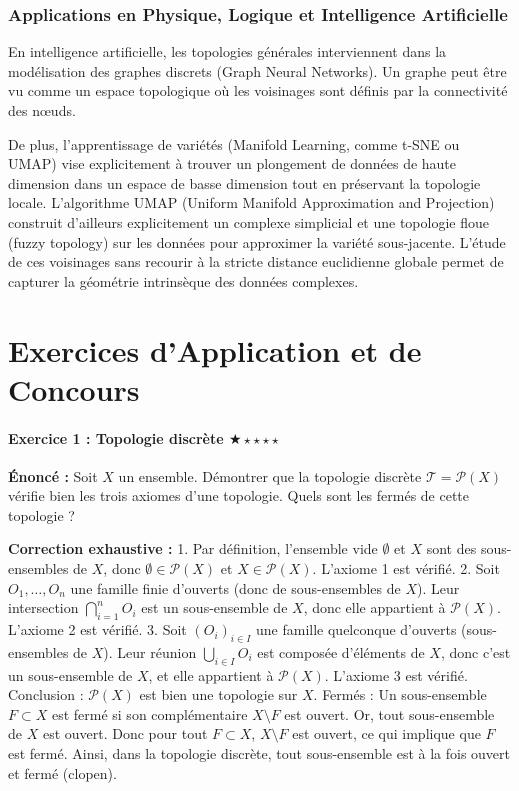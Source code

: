\documentclass[11pt,a4paper]{article}
\begin{document}
\section{Applications en Physique, Logique et Intelligence Artificielle}

En intelligence artificielle, les topologies générales interviennent dans la modélisation des graphes discrets (Graph Neural Networks). Un graphe peut être vu comme un espace topologique où les voisinages sont définis par la connectivité des nœuds.

De plus, l'apprentissage de variétés (Manifold Learning, comme t-SNE ou UMAP) vise explicitement à trouver un plongement de données de haute dimension dans un espace de basse dimension tout en préservant la topologie locale. L'algorithme UMAP (Uniform Manifold Approximation and Projection) construit d'ailleurs explicitement un complexe simplicial et une topologie floue (fuzzy topology) sur les données pour approximer la variété sous-jacente. L'étude de ces voisinages sans recourir à la stricte distance euclidienne globale permet de capturer la géométrie intrinsèque des données complexes.

\newpage
\part{Exercices d'Application et de Concours}
\subsection*{Exercice 1 : Topologie discrète \quad $\bigstar\star\star\star\star$}
\textbf{Énoncé :}
Soit $X$ un ensemble. Démontrer que la topologie discrète $\mathcal{T} = \mathcal{P}(X)$ vérifie bien les trois axiomes d'une topologie. Quels sont les fermés de cette topologie ?

\textbf{Correction exhaustive :}
1. Par définition, l'ensemble vide $\emptyset$ et $X$ sont des sous-ensembles de $X$, donc $\emptyset \in \mathcal{P}(X)$ et $X \in \mathcal{P}(X)$. L'axiome 1 est vérifié.
2. Soit $O_1, \dots, O_n$ une famille finie d'ouverts (donc de sous-ensembles de $X$). Leur intersection $\bigcap_{i=1}^n O_i$ est un sous-ensemble de $X$, donc elle appartient à $\mathcal{P}(X)$. L'axiome 2 est vérifié.
3. Soit $(O_i)_{i \in I}$ une famille quelconque d'ouverts (sous-ensembles de $X$). Leur réunion $\bigcup_{i \in I} O_i$ est composée d'éléments de $X$, donc c'est un sous-ensemble de $X$, et elle appartient à $\mathcal{P}(X)$. L'axiome 3 est vérifié.
Conclusion : $\mathcal{P}(X)$ est bien une topologie sur $X$.
Fermés : Un sous-ensemble $F \subset X$ est fermé si son complémentaire $X \setminus F$ est ouvert. Or, tout sous-ensemble de $X$ est ouvert. Donc pour tout $F \subset X$, $X \setminus F$ est ouvert, ce qui implique que $F$ est fermé. Ainsi, dans la topologie discrète, tout sous-ensemble est à la fois ouvert et fermé (clopen).
\end{document}
